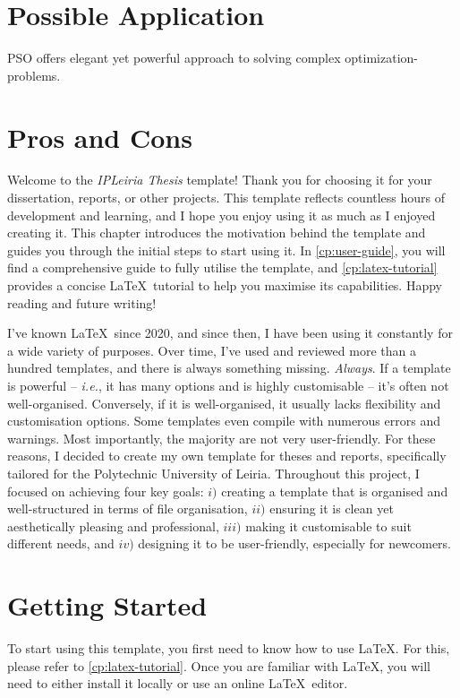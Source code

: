 {\section{Possible Application}

PSO offers elegant yet powerful approach to solving complex \glspl{optimization-problem}.

\section{Pros and Cons}
Welcome to the \textcolor{maincolor}{\textit{IPLeiria Thesis}} template! Thank you for choosing it for your dissertation, reports, or other projects. This template reflects countless hours of development and learning, and I hope you enjoy using it as much as I enjoyed creating it. This chapter introduces the motivation behind the template and guides you through the initial steps to start using it. In \autoref{cp:user-guide}, you will find a comprehensive guide to fully utilise the template, and \autoref{cp:latex-tutorial} provides a concise \LaTeX~tutorial to help you maximise its capabilities. Happy reading and future writing!

I've known \LaTeX~since 2020, and since then, I have been using it constantly for a wide variety of purposes. Over time, I've used and reviewed more than a hundred templates, and there is always something missing. \textit{Always}. If a template is powerful -- \textit{i.e.}, it has many options and is highly customisable -- it's often not well-organised. Conversely, if it is well-organised, it usually lacks flexibility and customisation options. Some templates even compile with numerous errors and warnings. Most importantly, the majority are not very user-friendly. For these reasons, I decided to create my own template for theses and reports, specifically tailored for the Polytechnic University of Leiria. Throughout this project, I focused on achieving four key goals: \(i)\) creating a template that is organised and well-structured in terms of file organisation, \(ii)\) ensuring it is clean yet aesthetically pleasing and professional, \(iii)\) making it customisable to suit different needs, and \(iv)\) designing it to be user-friendly, especially for newcomers.

\section{Getting Started}
To start using this template, you first need to know how to use \LaTeX. For this, please refer to \autoref{cp:latex-tutorial}. Once you are familiar with \LaTeX, you will need to either install it locally or use an online \LaTeX~editor.

}
